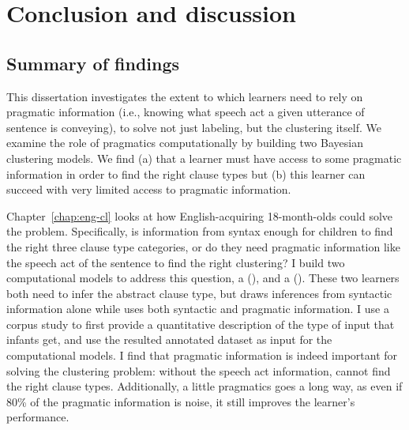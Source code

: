 \chapter{Conclusion and discussion}
\label{chap:discussion}

\section{Summary of findings}



This dissertation investigates the extent to which learners need to rely on pragmatic information (i.e., knowing what speech act a given utterance of sentence is conveying), to solve not just labeling, but the clustering itself. We examine the role of pragmatics computationally by building two Bayesian clustering models. We find (a) that a learner must have access to some pragmatic information in order to find the right clause types but (b) this learner can succeed with very limited access to pragmatic information. 

Chapter~\ref{chap:eng-cl} looks at how English-acquiring 18-month-olds could solve the problem. Specifically, is information from syntax enough for children to find the right three clause type categories, or do they need pragmatic information like the speech act of the sentence to find the right clustering? I build two computational models to address this question, a \distlearner{} (\dlearnerabbr{}), and a \praglearner{} (\plearnerabbr{}). These two learners both need to infer the abstract clause type, but \dlearnerabbr{} draws inferences from syntactic information alone while \plearnerabbr{} uses both syntactic and pragmatic information. I use a corpus study to first provide a quantitative description of the type of input that infants get, and use the resulted annotated dataset as input for the computational models. I find that pragmatic information is indeed important for solving the clustering problem: without the speech act information, \dlearnerabbr{} cannot find the right clause types. Additionally, a little pragmatics goes a long way, as  even if 80\% of the pragmatic information is noise, it still improves the learner's performance. 

